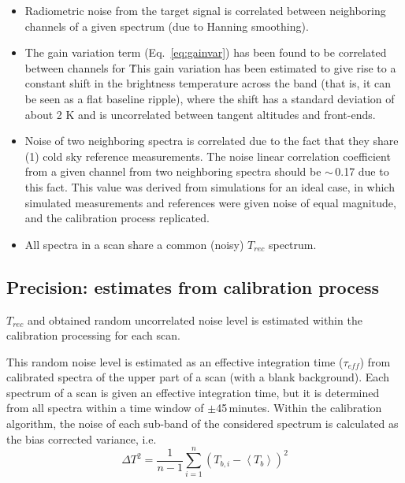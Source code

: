 \begin{itemize}

\item Radiometric noise from the target signal is correlated between 
neighboring channels of a given spectrum (due to Hanning smoothing).

\item The gain variation term (Eq.~\ref{eq:gainvar}) has been found to be correlated 
between channels for \smr\.
This gain variation has been estimated to give rise to a constant
shift in the brightness temperature across the band (that is, it can 
be seen as a flat baseline ripple), where the shift
has a standard deviation of about 2 K and is uncorrelated
between tangent altitudes and front-ends.

\item Noise of two neighboring spectra is correlated due to
the fact that they share (1) cold sky reference measurements. 
The noise linear correlation coefficient from a given channel
from two neighboring spectra should be \(\sim\)\,0.17 due to this
fact. This value was derived from simulations for an ideal
case, in which simulated measurements and references were 
given noise of equal magnitude, and the calibration
process replicated.

\item All spectra in a scan share a common (noisy) \(T_{rec}\)
spectrum. 

\end{itemize}

\subsection{Precision: estimates from calibration process}
\label{sec:caluncer}

\(T_{rec}\) and obtained random uncorrelated noise level is estimated within the 
calibration processing for each scan.


This random noise level is estimated as an effective integration time
(\(\tau_{eff}\)) from calibrated spectra of the upper part of a scan 
(with a blank background). Each spectrum of a scan is given an effective
integration time, but it is determined from all spectra within a time
window of \(\pm\)45\,minutes. 
Within the calibration algorithm, the noise of each sub-band of
the considered spectrum is calculated as the bias corrected variance, i.e.
\begin{equation}
\Delta T^{2} = \frac{1}{n-1}\sum_{i=1}^{n}(T_{b,i}-\left<T_{b}\right>)^{2}
\end{equation}

